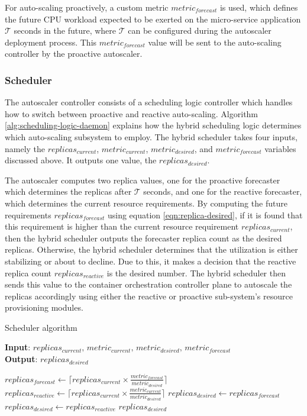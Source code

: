 For auto-scaling proactively, a custom metric $metric_{forecast}$ is used, which defines the future CPU workload expected to be exerted on the micro-service application $\mathcal{T}$ seconds in the future, where $\mathcal{T}$ can be configured during the autoscaler deployment process. This $metric_{forecast}$ value will be sent to the auto-scaling controller by the proactive autoscaler.\par

\subsubsection{Scheduler}

The autoscaler controller consists of a scheduling logic controller which handles how to switch between proactive and reactive auto-scaling. Algorithm \ref{alg:scheduling-logic-daemon} explains how the hybrid scheduling logic determines which auto-scaling subsystem to employ. The hybrid scheduler takes four inputs, namely the $replicas_{current}$, $metric_{current}$, $metric_{desired}$, and $metric_{forecast}$ variables discussed above. It outputs one value, the $replicas_{desired}$.\par

The autoscaler computes two replica values, one for the proactive forecaster which determines the replicas after $\mathcal{T}$ seconds, and one for the reactive forecaster, which determines the current resource requirements. By computing the future requirements $replicas_{forecast}$ using equation \ref{eqn:replica-desired}, if it is found that this requirement is higher than the current resource requirement $replicas_{current}$, then the hybrid scheduler outputs the forecaster replica count as the desired replicas. Otherwise, the hybrid scheduler determines that the utilization is either stabilizing or about to decline. Due to this, it makes a decision that the reactive replica count $replicas_{reactive}$ is the desired number. The hybrid scheduler then sends this value to the container orchestration controller plane to autoscale the replicas accordingly using either the reactive or proactive sub-system's resource provisioning modules.\par

\begin{algorithm}
    \caption{Scheduler algorithm}
    \label{alg:scheduling-logic-daemon}
    \textbf{Input}: $replicas_{current},\, metric_{current},\, metric_{desired},\, metric_{forecast}$\\
    \textbf{Output}: $replicas_{desired}$
    \begin{algorithmic}
        \State $replicas_{forecast} \gets \lceil replicas_{current} \times \frac{metric_{forecast}}{metric_{desired}}\rceil$
        \State $replicas_{reactive} \gets \lceil replicas_{current} \times \frac{metric_{current}}{metric_{desired}}\rceil$
            \State $replicas_{desired} \gets replicas_{forecast}$
        \Else
            \State $replicas_{desired} \gets replicas_{reactive}$
        \EndIf
        \State \Return $replicas_{desired}$
    \end{algorithmic}
\end{algorithm}

